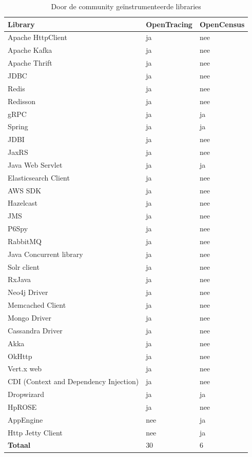 \begin{table}
	\label{tbl:instrumented_libraries}
	\caption{Door de community geïnstrumenteerde libraries}
	\begin{center}
	\begin{tabular}{| p{5cm} | l | l |}
	\hline
	\textbf{Library} & \textbf{OpenTracing} & \textbf{OpenCensus} \\ \hline \hline
	Apache HttpClient & ja & nee \\ \hline
	Apache Kafka & ja & nee \\ \hline
	Apache Thrift & ja & nee \\ \hline
	JDBC & ja & nee \\ \hline
	Redis & ja & nee \\ \hline
	Redisson & ja & nee \\ \hline
	gRPC & ja & ja \\ \hline
	Spring & ja & ja \\ \hline
	JDBI & ja & nee \\ \hline
	JaxRS & ja & nee \\ \hline
	Java Web Servlet & ja & ja \\ \hline
	Elasticsearch Client & ja & nee \\ \hline
	AWS SDK & ja & nee \\ \hline
	Hazelcast & ja & nee \\ \hline
	JMS & ja & nee \\ \hline
	P6Spy & ja & nee \\ \hline
	RabbitMQ & ja & nee \\ \hline
	Java Concurrent library & ja & nee \\ \hline
	Solr client & ja & nee \\ \hline
	RxJava & ja & nee \\ \hline
	Neo4j Driver & ja & nee \\ \hline
	Memcached Client & ja & nee \\ \hline
	Mongo Driver & ja & nee \\ \hline
	Cassandra Driver & ja & nee \\ \hline
	Akka & ja & nee \\ \hline
	OkHttp & ja & nee \\ \hline
	Vert.x web & ja & nee \\ \hline
	CDI (Context and Dependency Injection) & ja & nee \\ \hline
	Dropwizard & ja & ja \\ \hline
	HpROSE & ja & nee \\ \hline
	AppEngine & nee & ja \\ \hline
	Http Jetty Client & nee & ja \\ \hline \hline
	\textbf{Totaal} & 30 & 6 \\ \hline
	\end{tabular}
\end{center}
\end{table}

